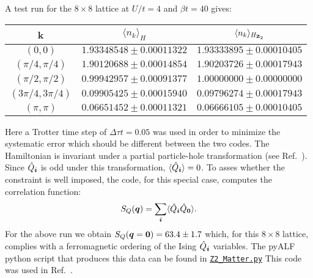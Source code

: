 A test run for the $8\times 8 $ lattice at $U/t = 4$ and $\beta t = 40$ gives:
\begin{center}
\begin{tabular}{@{} c c c @{}}
 \toprule
   k                      & $\langle n_k \rangle_{H} $     &  $\langle n_k \rangle_{H_{\mathbf{Z}_{2}}}$\\
  \midrule
   $(0,0)$                & $1.93348548  \pm  0.00011322$  &  $ 1.93333895  \pm  0.00010405 $ \\
   $(\pi/4, \pi/4)$       & $1.90120688  \pm  0.00014854$  &  $ 1.90203726  \pm  0.00017943 $ \\
   $(\pi/2, \pi/2)$       & $0.99942957  \pm  0.00091377$  &  $ 1.00000000  \pm  0.00000000 $ \\
   $(3\pi/4, 3\pi/4)$     & $0.09905425  \pm  0.00015940$  &  $ 0.09796274  \pm  0.00017943 $ \\
   $(\pi,\pi)$            & $0.06651452  \pm  0.00011321$  &  $ 0.06666105  \pm  0.00010405 $ \\
  \bottomrule
\end{tabular}

\end{center}
\vspace*{0.5cm}
Here a Trotter time step of  $\Delta \tau t = 0.05$ was used in order to minimize the systematic error   which should be different  between the two codes.   The Hamiltonian is invariant under a partial particle-hole transformation (see Ref.~\cite{Assaad16}).
Since $\hat{Q}_{\boldsymbol{i}} $ is odd under this  transformation, $\langle \hat{Q}_{\boldsymbol{i}}  \rangle =0$.
 To asses whether the constraint is well imposed,  the code,  for this special case, computes the correlation function:
\begin{equation}
	   S_Q(\boldsymbol{q})  = \sum_{\boldsymbol{i}}    \langle \hat{Q}_{\boldsymbol{i}} \hat{Q}_{\boldsymbol{0}}   \rangle.
\end{equation}
For the above run we obtain  $ S_Q(\boldsymbol{q} = \boldsymbol{0}) = 63.4 \pm 1.7 $  which,   for this $ 8\times 8$ lattice, complies with a ferromagnetic ordering of the 
Ising  $\hat{Q}_{\boldsymbol{i}}$  variables.    The pyALF python script that produces this data can be found in  \href{https://git.physik.uni-wuerzburg.de/ALF/pyALF/-/blob/master/Scripts/Z2_Matter.py}{\texttt{Z2\_Matter.py}}
This code  was used in Ref.~\cite{Hohenadler19}.  


